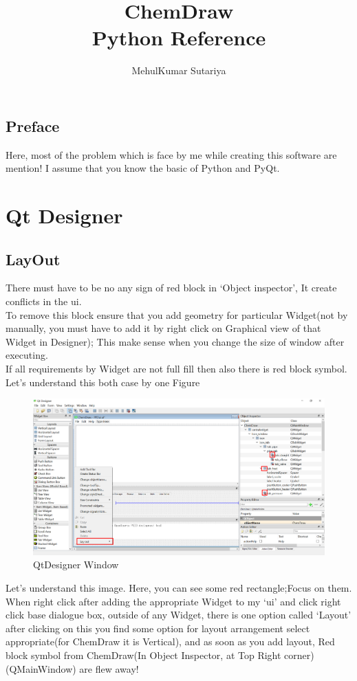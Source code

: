 \documentclass[12pt,a4paper,oneside]{book}
\author{MehulKumar Sutariya}
\title{{\bf{\Huge ChemDraw}}\\{\large Python Reference}}
\date{}
\begin{document}
\maketitle
\section*{Preface}
Here, most of the problem which is face by me while creating this software are mention! I assume that you know the basic of Python and PyQt.
\chapter{Qt Designer}
\section{LayOut}
There must have to be no any sign of red block in `Object inspector', It create conflicts in the ui.\\
To remove this block ensure that you add geometry for particular Widget(not by manually, you must have to add it by right click on Graphical view of that Widget in Designer); This make sense when you change the size of window after executing.\\
If all requirements by Widget are not full fill then also there is red block symbol.\\
Let's understand this both case by one Figure
\begin{figure}[h]
\centering
\includegraphics[scale=0.4]{SS/layout.png}
\caption{QtDesigner Window}
\end{figure}
Let's understand this image. Here, you can see some red rectangle;Focus on them. When   right click after adding the appropriate Widget to my `ui' and click right click base dialogue box, outside of any Widget, there is one option called `Layout' after clicking on this you find some option for layout arrangement select appropriate(for ChemDraw it is Vertical), and as soon as you add layout, Red block symbol from ChemDraw(In Object Inspector, at Top Right corner) (QMainWindow) are flew away!\\
\end{document}
